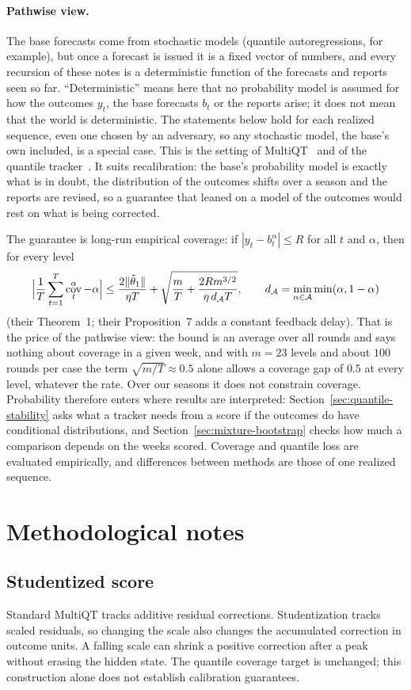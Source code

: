 \documentclass[11pt,a4paper]{article}
\newcommand{\A}{\mathcal{A}}
\DeclareMathOperator{\cov}{cov}
\DeclarePairedDelimiter{\norm}{\lVert}{\rVert}
\theoremstyle{definition}
\theoremstyle{remark}
\begin{document}
\paragraph{Pathwise view.}
The base forecasts come from stochastic models (quantile autoregressions,
for example), but once a forecast is issued it is a fixed vector of
numbers, and every recursion of these notes is a deterministic function of
the forecasts and reports seen so far. ``Deterministic'' means here that no
probability model is assumed for how the outcomes $y_t$, the base forecasts
$b_t$ or the reports arise; it does not mean that the world is
deterministic. The statements below hold for each realized sequence, even
one chosen by an adversary, so any stochastic model, the base's own
included, is a special case. This is the setting of MultiQT~\cite{multiqt}
and of the quantile tracker~\cite{pid}. It suits recalibration: the base's
probability model is exactly what is in doubt, the distribution of the
outcomes shifts over a season and the reports are revised, so a guarantee
that leaned on a model of the outcomes would rest on what is being
corrected.

The guarantee is long-run empirical coverage: if $|y_t-b_t^\alpha|\le R$
for all $t$ and $\alpha$, then for every level
\[
 \Bigl|\frac1T\sum_{t=1}^T\cov_t^\alpha-\alpha\Bigr|
 \le\frac{2\norm{\tilde\theta_1}}{\eta T}
 +\sqrt{\frac{m}{T}+\frac{2Rm^{3/2}}{\eta\,d_\A T}},\qquad
 d_\A=\min_{\alpha\in\A}\min(\alpha,1-\alpha)
\]
(their Theorem~1; their Proposition~7 adds a constant feedback delay).
That is the price of the pathwise view: the bound is an average over all
rounds and says nothing about coverage in a given week, and with $m=23$
levels and about $100$ rounds per case the term $\sqrt{m/T}\approx0.5$
alone allows a coverage gap of $0.5$ at every level, whatever the rate.
Over our seasons it does not constrain coverage. Probability therefore
enters where results are interpreted:
Section~\ref{sec:quantile-stability} asks what a tracker needs from a score
if the outcomes do have conditional distributions, and
Section~\ref{sec:mixture-bootstrap} checks how much a comparison depends
on the weeks scored. Coverage and quantile loss are evaluated
empirically, and differences between methods are those of one realized
sequence.

\clearpage
\section{Methodological notes}
\subsection{Studentized score}
Standard MultiQT tracks additive residual corrections. Studentization
tracks scaled residuals, so changing the scale also changes the
accumulated correction in outcome units. A falling scale can shrink a
positive correction after a peak without erasing the hidden state.
The quantile coverage target is unchanged; this construction alone
does not establish calibration guarantees.
\end{document}

